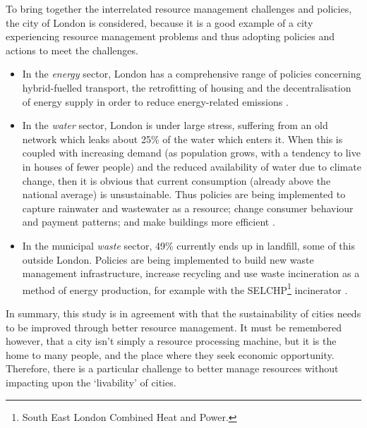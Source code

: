 To bring together the interrelated resource management challenges and policies, the city of London is considered, because it is a good example of a city experiencing resource management problems and thus adopting policies and actions to meet the challenges.
\begin{itemize}
	\item In the \emph{energy} sector, London has a comprehensive range of policies concerning hybrid-fuelled transport, the retrofitting of housing and the decentralisation of energy supply in order to reduce energy-related emissions \citep{Strategy2011}. 
	\item In the \emph{water} sector, London is under large stress, suffering from an old network which leaks about 25\% of the water which enters it. When this is coupled with increasing demand (as population grows, with a tendency to live in houses of fewer people) and the reduced availability of water due to climate change, then it is obvious that current consumption (already above the national average) is unsustainable. Thus policies are being implemented to capture rainwater and wastewater as a resource; change consumer behaviour and payment patterns; and make buildings more efficient \citep{Nickson2011}. 
	\item In the municipal \emph{waste} sector, 49\% currently ends up in landfill, some of this outside London. Policies are being implemented to build new waste management infrastructure, increase recycling and use waste incineration as a method of energy production, for example with the SELCHP\footnote{South East London Combined Heat and Power.} incinerator \citep{Zabala2011}.
\end{itemize}

In summary, this study is in agreement with \citet{Newman1999} that the sustainability of cities needs to be improved through better resource management. It must be remembered however, that a city isn't simply a resource processing machine, but it is the home to many people, and the place where they seek economic opportunity.  Therefore, there is a particular challenge to better manage resources without impacting upon the `livability' of cities. %


